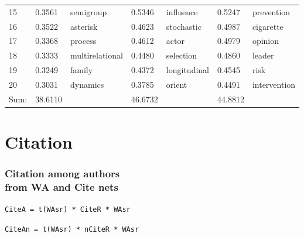 \documentclass[hyperref={pdfstartview={FitBH -32768},
                         pdfpagemode=FullScreen,
                         plainpages=false,
                         colorlinks=true}
              ]{beamer}
\begin{document}
\begin{frame}[fragile]
\begin{center}
\begin{tabular}{p{0.5cm}|p{0.8cm}|p{1.7cm}||p{0.8cm}|p{1.4cm}||p{0.8cm}|p{1.6cm}}
          15   & 	0.3561  &  semigroup	    &	0.5346  &	 influence	    &	    0.5247  &	 prevention	   \\
          16   & 	0.3522  &  asterisk	    &	0.4623  &	 stochastic	    &	    0.4987  &	 cigarette	   \\
          17   & 	0.3368  &  process	    &	0.4612  &	 actor		    &	    0.4979  &	 opinion	   \\
          18   & 	0.3333  &  multirelational  &	0.4480  &	 selection	    &	    0.4860  &	 leader	   \\
          19   & 	0.3249  &  family	    &	0.4372  &	 longitudinal	    &	    0.4545  &	 risk	   \\
          20   & 	0.3031  &  dynamics	    &	0.3785  &	 orient		    &	    0.4491  &	 intervention  \\ \hline
       Sum:    & 38.6110	& 		    &	46.6732 &	&       	    44.8812&	 	   \\ \hline
\end{tabular}
\end{center}

\end{frame}

\section{Citation} 

\begin{frame}[fragile]
\frametitle{Citation among authors \\ \normalsize from WA and Cite nets}
\small

\texttt{CiteA = t(WAsr) * CiteR * WAsr} \medskip

\texttt{CiteAn = t(WAsr) * nCiteR * WAsr} \smallskip

\end{frame}
\end{document}
